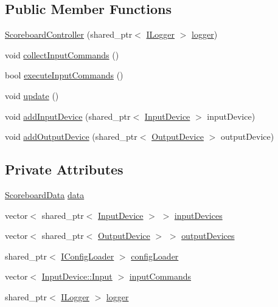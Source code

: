\subsection*{Public Member Functions}
\begin{DoxyCompactItemize}
\item 
\hyperlink{class_scoreboard_controller_a91b4c81d76de5840fa48ec794ba2ee08}{Scoreboard\+Controller} (shared\+\_\+ptr$<$ \hyperlink{class_i_logger}{I\+Logger} $>$ \hyperlink{class_scoreboard_controller_a4ebbb799945c5968d44c91266735a1d4}{logger})
\item 
void \hyperlink{class_scoreboard_controller_a79f3f5a26387ac5daabc34e90dd25e06}{collect\+Input\+Commands} ()
\item 
bool \hyperlink{class_scoreboard_controller_a5365e2a960e16cf49dca0852682b0499}{execute\+Input\+Commands} ()
\item 
void \hyperlink{class_scoreboard_controller_a05414b34fd7f4455ddb0ac98490639dc}{update} ()
\item 
void \hyperlink{class_scoreboard_controller_aa42bf3e044b51f70fa6edc3a830809a0}{add\+Input\+Device} (shared\+\_\+ptr$<$ \hyperlink{class_input_device}{Input\+Device} $>$ input\+Device)
\item 
void \hyperlink{class_scoreboard_controller_a7b2cc34a33c8203da586ffaab1fb3982}{add\+Output\+Device} (shared\+\_\+ptr$<$ \hyperlink{class_output_device}{Output\+Device} $>$ output\+Device)
\end{DoxyCompactItemize}
\subsection*{Private Attributes}
\begin{DoxyCompactItemize}
\item 
\hyperlink{struct_scoreboard_data}{Scoreboard\+Data} \hyperlink{class_scoreboard_controller_af6d8c4336b7c5b71d9d9ccd2f8a3f6d0}{data}
\item 
vector$<$ shared\+\_\+ptr$<$ \hyperlink{class_input_device}{Input\+Device} $>$ $>$ \hyperlink{class_scoreboard_controller_a52fc99700dbe759cf0ffadf92219c229}{input\+Devices}
\item 
vector$<$ shared\+\_\+ptr$<$ \hyperlink{class_output_device}{Output\+Device} $>$ $>$ \hyperlink{class_scoreboard_controller_a905c2a68cb4b0b769385ebdc13adf595}{output\+Devices}
\item 
shared\+\_\+ptr$<$ \hyperlink{class_i_config_loader}{I\+Config\+Loader} $>$ \hyperlink{class_scoreboard_controller_aebcab5e4054ef77db1c9de9ed889e573}{config\+Loader}
\item 
vector$<$ \hyperlink{class_input_device_a75152d8f06b6d032036014e42e44688b}{Input\+Device\+::\+Input} $>$ \hyperlink{class_scoreboard_controller_a77a8287bcad5b5101b6be16f1314bc84}{input\+Commands}
\item 
shared\+\_\+ptr$<$ \hyperlink{class_i_logger}{I\+Logger} $>$ \hyperlink{class_scoreboard_controller_a4ebbb799945c5968d44c91266735a1d4}{logger}
\end{DoxyCompactItemize}


